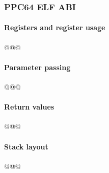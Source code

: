 \subsubsection{PPC64 ELF ABI}

\paragraph{Registers and register usage}

@@@


\paragraph{Parameter passing}

@@@


\paragraph{Return values}

@@@


\paragraph{Stack layout}

@@@

